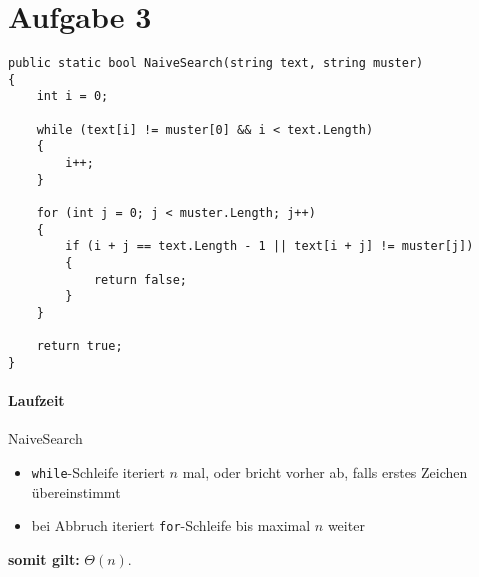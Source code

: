 \section*{Aufgabe 3}
\begin{verbatim}
public static bool NaiveSearch(string text, string muster)
{
	int i = 0;
	
	while (text[i] != muster[0] && i < text.Length)
	{
		i++;
	}

	for (int j = 0; j < muster.Length; j++)
	{
    	if (i + j == text.Length - 1 || text[i + j] != muster[j])
    	{
    		return false;
    	}
	}

	return true;
}
\end{verbatim}

\paragraph{Laufzeit} NaiveSearch \\
\begin{itemize}[nolistsep, noitemsep]
    \item \texttt{while}-Schleife iteriert $n$ mal, oder bricht vorher ab, falls erstes Zeichen übereinstimmt
    \item bei Abbruch iteriert \texttt{for}-Schleife bis maximal $n$ weiter
\end{itemize}

\textbf{somit gilt:} $\Theta(n)$.